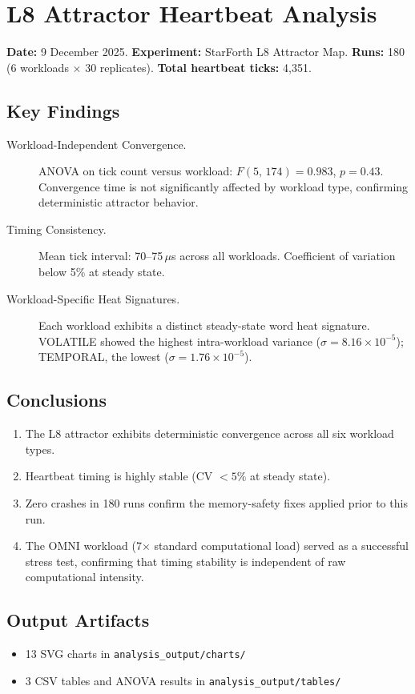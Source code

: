 
\section{L8 Attractor Heartbeat Analysis}

\textbf{Date:} 9 December 2025. \textbf{Experiment:} StarForth L8 Attractor
Map. \textbf{Runs:} 180 (6 workloads $\times$ 30 replicates).
\textbf{Total heartbeat ticks:} 4{,}351.

\subsection{Key Findings}

\begin{description}
  \item[Workload-Independent Convergence.]
        ANOVA on tick count versus workload: $F(5,\,174) = 0.983$,
        $p = 0.43$. Convergence time is not significantly affected by
        workload type, confirming deterministic attractor behavior.

  \item[Timing Consistency.]
        Mean tick interval: 70--75\,$\mu$s across all workloads.
        Coefficient of variation below 5\% at steady state.

  \item[Workload-Specific Heat Signatures.]
        Each workload exhibits a distinct steady-state word heat signature.
        VOLATILE showed the highest intra-workload variance
        ($\sigma = 8.16 \times 10^{-5}$); TEMPORAL, the lowest
        ($\sigma = 1.76 \times 10^{-5}$).
\end{description}

\subsection{Conclusions}

\begin{enumerate}
  \item The L8 attractor exhibits deterministic convergence across all six
        workload types.
  \item Heartbeat timing is highly stable (CV $< 5\%$ at steady state).
  \item Zero crashes in 180 runs confirm the memory-safety fixes applied
        prior to this run.
  \item The OMNI workload (7$\times$ standard computational load) served as
        a successful stress test, confirming that timing stability is
        independent of raw computational intensity.
\end{enumerate}

\subsection{Output Artifacts}

\begin{itemize}
  \item 13 SVG charts in \texttt{analysis\_output/charts/}
  \item 3 CSV tables and ANOVA results in \texttt{analysis\_output/tables/}
\end{itemize}
